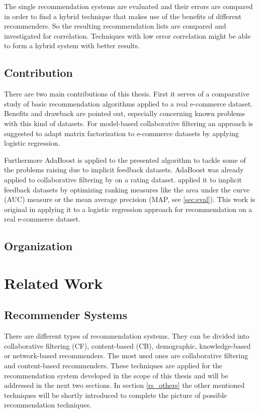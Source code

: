\documentclass[10pt]{reportMaster}
\begin{document}
The single recommendation systems are evaluated and their errors are compared in order to find a hybrid technique that makes use of the benefits of different recommenders. %
So the resulting recommendation lists are compared and investigated for correlation.
Techniques with low error correlation might be able to form a hybrid system with better results.


\section{Contribution}
There are two main contributions of this thesis.
First it serves of a comparative study of basic recommendation algorithms applied to a real e-commerce dataset.
Benefits and drawback are pointed out, especially concerning known problems with this kind of datasets.
For model-based collaborative filtering an approach is suggested to adapt matrix factorization to e-commerce datasets by applying logistic regression.

Furthermore AdaBoost is applied to the presented algorithm to tackle some of the problems raising due to implicit feedback datasets.
AdaBoost was already applied to collaborative filtering by \cite{boostingCFRatings} on a rating dataset.
\cite{boostingAUC} applied it to implicit feedback datasets by optimizing ranking measures like the area under the curve (AUC) measure or the mean average precision (MAP, see \ref{sec:eval}).
This work is original in applying it to a logistic regression approach for recommendation on a real e-commerce dataset.


\section{Organization}






\chapter{Related Work}
\section{Recommender Systems}
There are different types of recommendation systems.
They can be divided into collaborative filtering (CF), content-based (CB), demographic, knowledge-based or network-based recommenders. %
The most used ones are collaborative filtering and content-based recommenders.
These techniques are applied for the recommendation system developed in the scope of this thesis and will be addressed in the next two sections.
In section \ref{rs_others} the other mentioned techniques will be shortly introduced to complete the picture of possible recommendation techniques.
\end{document}
